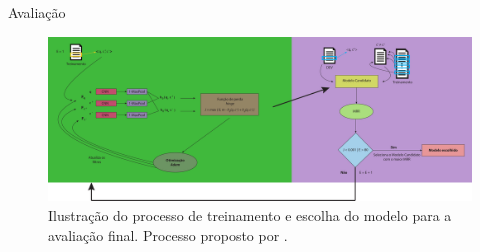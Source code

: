 \documentclass[10pt]{beamer}
\begin{document}
\begin{frame}{Avaliação}
	\begin{figure}[h]
        \centering
        \includegraphics[width=1\linewidth]{figuras/evaluation_process.pdf}
        \caption{Ilustração do processo de treinamento e escolha do modelo para a avaliação final. Processo proposto por \cite{iyer-etal-2016-summarizing}.}
        \label{fig:test1}
    \end{figure}
\end{frame}
\end{document}
